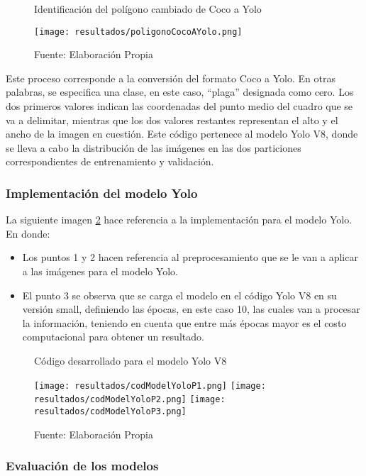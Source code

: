 \begin{figure}[h]
\centering
\caption{Identificación del polígono cambiado de Coco a Yolo}
\texttt{[image: resultados/poligonoCocoAYolo.png]}
\caption*{\footnotesize Fuente: Elaboración Propia}
\label{fig:figuraPoligonoCocoAYolo}
\end{figure}


Este proceso corresponde a la conversión del formato Coco a Yolo. En otras palabras, se especifica una clase, en este caso, ``plaga'' designada como cero. Los dos primeros valores indican las coordenadas del punto medio del cuadro que se va a delimitar, mientras que los dos valores restantes representan el alto y el ancho de la imagen en cuestión. Este código pertenece al modelo Yolo V8, donde se lleva a cabo la distribución de las imágenes en las dos particiones correspondientes de entrenamiento y validación.


\subsubsection{Implementación del modelo Yolo}

La siguiente imagen \ref{fig:figuraCodModelYolo} hace referencia a la implementación para el modelo Yolo. En donde:

\begin{itemize}
    \item Los puntos 1 y 2 hacen referencia al preprocesamiento que se le van a aplicar a las imágenes para el modelo Yolo.
    \item El punto 3 se observa que se carga el modelo en el código Yolo V8 en su versión small, definiendo las épocas, en este caso 10, las cuales van a procesar la información, teniendo en cuenta que entre más épocas mayor es el costo computacional para obtener un resultado. 
\end{itemize}

\newpage

\begin{figure}[h]
\centering
\caption{Código desarrollado para el modelo Yolo V8}
\texttt{[image: resultados/codModelYoloP1.png]}
\texttt{[image: resultados/codModelYoloP2.png]}
\texttt{[image: resultados/codModelYoloP3.png]}
\caption*{\footnotesize Fuente: Elaboración Propia}
\label{fig:figuraCodModelYolo}
\end{figure}

\subsubsection{Evaluación de los modelos}

